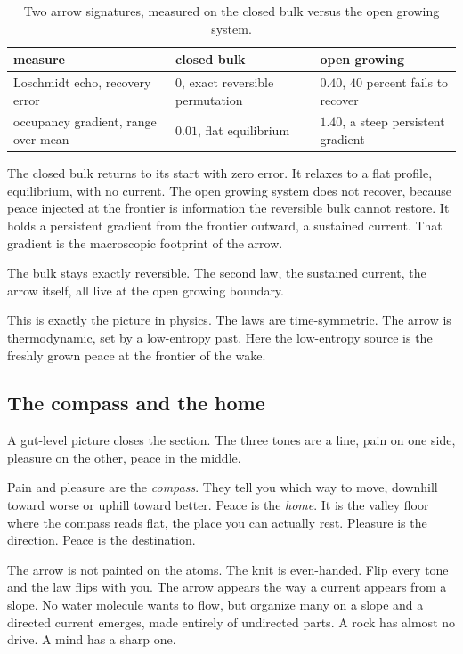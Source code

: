 \begin{table}[ht]
\centering
\begin{tabular}{@{}lll@{}}
\toprule
measure & closed bulk & open growing \\
\midrule
Loschmidt echo, recovery error & $0$, exact reversible permutation & $0.40$, $40$ percent fails to recover \\
occupancy gradient, range over mean & $0.01$, flat equilibrium & $1.40$, a steep persistent gradient \\
\bottomrule
\end{tabular}
\caption{Two arrow signatures, measured on the closed bulk versus the open growing system.}
\label{tab:arrow-measured}
\end{table}

The closed bulk returns to its start with zero error. It relaxes to a flat profile, equilibrium, with no current. The open growing system does not recover, because peace injected at the frontier is information the reversible bulk cannot restore. It holds a persistent gradient from the frontier outward, a sustained current. That gradient is the macroscopic footprint of the arrow.

\begin{result}
The bulk stays exactly reversible. The second law, the sustained current, the arrow itself, all live at the open growing boundary.
\end{result}

This is exactly the picture in physics. The laws are time-symmetric. The arrow is thermodynamic, set by a low-entropy past. Here the low-entropy source is the freshly grown peace at the frontier of the wake.

\subsection{The compass and the home}

A gut-level picture closes the section. The three tones are a line, pain on one side, pleasure on the other, peace in the middle.

Pain and pleasure are the \emph{compass}. They tell you which way to move, downhill toward worse or uphill toward better. Peace is the \emph{home}. It is the valley floor where the compass reads flat, the place you can actually rest. Pleasure is the direction. Peace is the destination.

The arrow is not painted on the atoms. The knit is even-handed. Flip every tone and the law flips with you. The arrow appears the way a current appears from a slope. No water molecule wants to flow, but organize many on a slope and a directed current emerges, made entirely of undirected parts. A rock has almost no drive. A mind has a sharp one.

